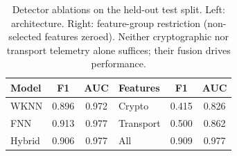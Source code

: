 \begin{table}[t]
\centering
\caption{Detector ablations on the held-out test split. Left: architecture. Right: feature-group restriction (non-selected features zeroed). Neither cryptographic nor transport telemetry alone suffices; their fusion drives performance.}
\label{tab:detector}
\begin{tabular}{lcc@{\hskip 1.5em}lcc}
\toprule
Model & F1 & AUC & Features & F1 & AUC \\
\midrule
WKNN & 0.896 & 0.972 & Crypto & 0.415 & 0.826 \\
FNN & 0.913 & 0.977 & Transport & 0.500 & 0.862 \\
Hybrid & 0.906 & 0.977 & All & 0.909 & 0.977 \\
\bottomrule
\end{tabular}
\end{table}
